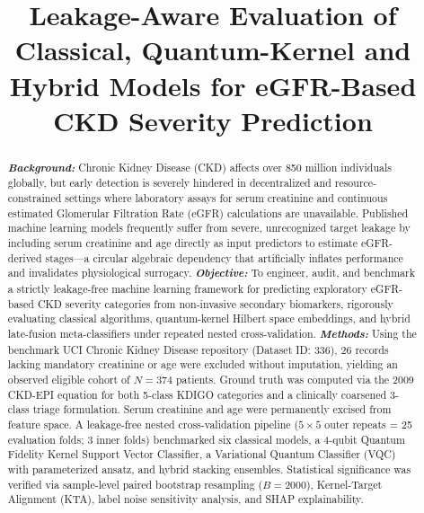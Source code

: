 \documentclass[conference]{IEEEtran}
\begin{document}
\title{Leakage-Aware Evaluation of Classical, Quantum-Kernel and Hybrid Models for eGFR-Based CKD Severity Prediction}

\author{
}

\maketitle

\begin{abstract}
\textbf{\textit{Background:}} Chronic Kidney Disease (CKD) affects over 850 million individuals globally, but early detection is severely hindered in decentralized and resource-constrained settings where laboratory assays for serum creatinine and continuous estimated Glomerular Filtration Rate (eGFR) calculations are unavailable. Published machine learning models frequently suffer from severe, unrecognized target leakage by including serum creatinine and age directly as input predictors to estimate eGFR-derived stages—a circular algebraic dependency that artificially inflates performance and invalidates physiological surrogacy.
\textbf{\textit{Objective:}} To engineer, audit, and benchmark a strictly leakage-free machine learning framework for predicting exploratory eGFR-based CKD severity categories from non-invasive secondary biomarkers, rigorously evaluating classical algorithms, quantum-kernel Hilbert space embeddings, and hybrid late-fusion meta-classifiers under repeated nested cross-validation.
\textbf{\textit{Methods:}} Using the benchmark UCI Chronic Kidney Disease repository (Dataset ID: 336), 26 records lacking mandatory creatinine or age were excluded without imputation, yielding an observed eligible cohort of $N = 374$ patients. Ground truth was computed via the 2009 CKD-EPI equation for both 5-class KDIGO categories and a clinically coarsened 3-class triage formulation. Serum creatinine and age were permanently excised from feature space. A leakage-free nested cross-validation pipeline ($5 \times 5$ outer repeats = 25 evaluation folds; 3 inner folds) benchmarked six classical models, a 4-qubit Quantum Fidelity Kernel Support Vector Classifier, a Variational Quantum Classifier (VQC) with parameterized ansatz, and hybrid stacking ensembles. Statistical significance was verified via sample-level paired bootstrap resampling ($B = 2000$), Kernel-Target Alignment (KTA), label noise sensitivity analysis, and SHAP explainability.

\end{abstract}
\end{document}
